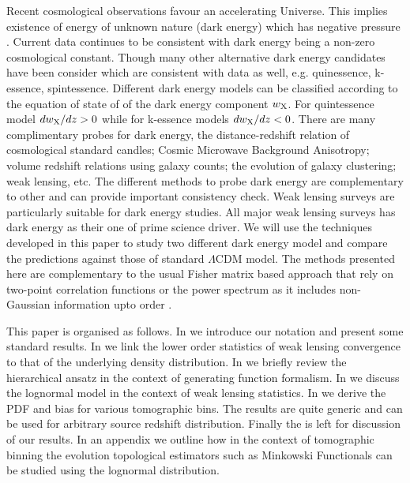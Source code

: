 \documentclass[usenatbib]{mn2e}
\begin{document}
Recent cosmological observations favour an accelerating Universe. This implies existence of
energy of unknown nature (dark energy) which has negative pressure \citep{Amen10,Wang10}. Current data 
continues to be consistent with dark energy being a non-zero cosmological constant.
Though many other alternative dark energy candidates have been consider which are
consistent  with data as well, e.g. quinessence, k-essence, spintessence.
Different dark energy models can be classified according to the equation of state of
of the dark energy component $w_{\rm X}$. For quintessence model  $dw_{\rm X}/dz>0$ while 
for k-essence models  $dw_{\rm X}/dz<0$. There are many complimentary probes for dark energy, 
the distance-redshift relation of cosmological standard candles; 
Cosmic Microwave Background Anisotropy; volume redshift relations using galaxy counts;
the evolution of galaxy clustering; weak lensing, etc. The different methods to probe 
dark energy are complementary to other and can provide important consistency check.
Weak lensing surveys are particularly suitable for dark energy studies. All major 
weak lensing surveys has dark energy as their one of prime science driver. We 
will use the techniques developed in this paper to study two different dark energy
model and compare the predictions against those of standard $\Lambda$CDM model.
The methods presented here are complementary to the usual Fisher matrix based approach
that rely on two-point correlation functions or the power spectrum as it includes
non-Gaussian information upto order .

This paper is organised as follows. In  we introduce our notation and present some standard results. 
In  we link the lower order statistics of weak lensing convergence to that of the underlying density
distribution. In  we briefly review the hierarchical ansatz in the context of 
generating function formalism. In  we discuss the lognormal model in the context of weak lensing
statistics. In  we derive the PDF and bias for various tomographic bins. The results
are quite generic and can be used for arbitrary source redshift distribution. Finally the 
is left for  discussion of our results. In an appendix we outline how in the context of tomographic binning
the evolution topological estimators such as Minkowski Functionals can be studied using the lognormal distribution.
%
\end{document}

